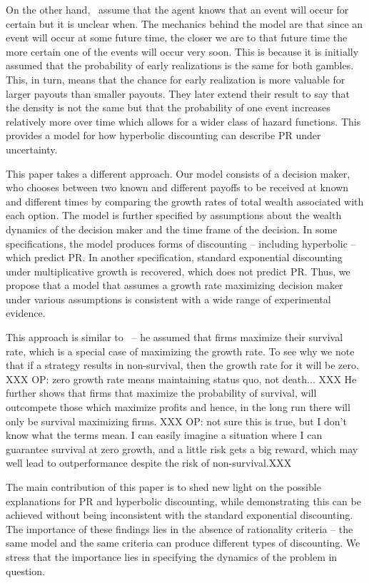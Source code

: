 \documentclass[11pt]{article}
\numberwithin{equation}{section}
\begin{document}
On the other hand,~\citet{dasgupta2005uncertainty} assume that the agent knows that an event will occur for certain but it is unclear when. The mechanics behind the model are that since an event will occur at some future time, the closer we are to that future time the more certain one of the events will occur very soon. This is because it is initially assumed that the probability of early realizations is the same for both gambles. This, in turn, means that the chance for early realization is more valuable for larger payouts than smaller payouts. They later extend their result to say that the density is not the same but that the probability of one event increases relatively more over time which allows for a wider class of hazard functions. This provides a model for how hyperbolic discounting can describe PR under uncertainty.

This paper takes a different approach. Our model consists of a decision maker, who chooses between two known and different payoffs to be received at known and different times by comparing the growth rates of total wealth associated with each option. The model is further specified by assumptions about the wealth dynamics of the decision maker and the time frame of the decision. In some specifications, the model produces forms of discounting -- including hyperbolic -- which predict PR. In another specification, standard exponential discounting under multiplicative growth is recovered, which does not predict PR. Thus, we propose that a model that assumes a growth rate maximizing decision maker under various assumptions is consistent with a wide range of experimental evidence.

This approach is similar to~\citet{Radner1998} -- he assumed that firms maximize their survival rate, which is a special case of maximizing the growth rate. To see why we note that if a strategy results in non-survival, then the growth rate for it will be zero. 
XXX OP: zero growth rate means maintaining status quo, not death... XXX
He further shows that firms that maximize the probability of survival, will outcompete those which maximize profits and hence, in the long run there will only be survival maximizing firms.
XXX OP: not sure this is true, but I don't know what the terms mean. I can easily imagine a situation where I can guarantee survival at zero growth, and a little risk gets a big reward, which may well lead to outperformance despite the risk of non-survival.XXX

The main contribution of this paper is to shed new light on the possible explanations for PR and hyperbolic discounting, while demonstrating this can be achieved without being inconsistent with the standard exponential discounting. The importance of these findings lies in the absence of rationality criteria -- the same model and the same criteria can produce different types of discounting. We stress that the importance lies in specifying the dynamics of the problem in question.
\end{document}
